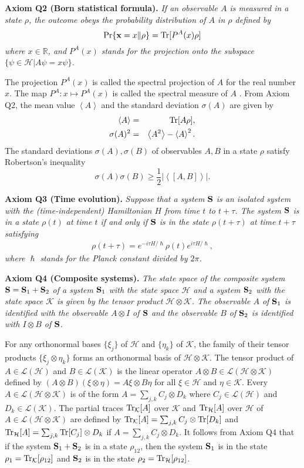 \documentclass[graybox]{svmult}
\newcommand{\beq}{\begin{equation}}
\newcommand{\eeq}{\end{equation}}
\newcommand{\beql}[1]{\begin{equation}\label{eq:#1}}
\newcommand{\beqa}{\begin{eqnarray}}
\newcommand{\eeqa}{\end{eqnarray}}
\newcommand{\bS}{{\bf S}}
\newcommand{\cH}{{\mathcal H}}
\newcommand{\cK}{{\mathcal K}}
\newcommand{\cL}{{\mathcal L}}
\newcommand{\et}{\eta}
\def\ps{\psi}
\newcommand{\rh}{\rho}
\newcommand{\si}{\sigma}
\newcommand{\ta}{\tau}
\newcommand{\Tr}{\mbox{\rm Tr}}
\newcommand{\bx}{{\bf x}}
\newcommand{\R}{\mathbb{R}}
\newcommand{\bracket}[1]{\left\langle#1\right\rangle}
\begin{document}
{\bf Axiom Q2 (Born statistical formula).}
{\em If an observable $A$ is measured in a state $\rho$, 
the outcome obeys the probability distribution
of $A$ in $\rho$ defined by
\beq
\Pr\{\bx=x\|\rh\}=\Tr[P^{A}(x)\rh]
\eeq
where $x\in\R$, and $P^{A}(x)$ stands for the projection 
onto the subspace $\{\ps\in\cH| A\ps=x\ps\}$.}
\bigskip


The projection $P^{A}(x)$ is called the spectral projection of $A$
for the real number $x$.
The map $P^{A}:x\mapsto P^{A}(x)$ is called the 
spectral measure of $A$ \cite{Hal51}.
From Axiom Q2, the mean value  $\bracket{A}$
and the standard deviation $\si(A)$ are given by
\beqa
\bracket{A}&=&\Tr[A\rh],\\
\si(A)^2&=&\bracket{A^2}-\bracket{A}^2.
\eeqa
The standard deviations $\si(A),\si(B)$
of observables $A,B$ in a state $\rh$ satisfy 
Robertson's inequality
\beql{URSP}
\si(A)\si(B)\ge\frac{1}{2}|\bracket{[A,B]}|.
\eeq
\bigskip

{\bf Axiom Q3 (Time evolution).}
{\em Suppose that a system $\bS$ is an isolated system with the (time-independent)
Hamiltonian $H$ from time $t$ to $t+\ta$.
The system $\bS$ is in a state  $\rh(t)$ at time $t$ if and only if\/ $\bS$ is in the
state $\rh(t+\ta)$ at time $t+\ta$ satisfying
\beqa
\rh(t+\ta)=e^{-i\ta H/\hslash}\rh(t)e^{i\ta H/\hslash},
\eeqa
where $\hslash$ stands for the Planck constant divided by $2\pi$.}
\bigskip

{\bf Axiom Q4 (Composite systems).}
{\em The state space of the composite system $\bS=\bS_{1}+\bS_{2}$ 
of a system $\bS_{1}$ with the
state space $\cH$ and a system  $\bS_{2}$ with the
state space $\cK$ is given by the tensor product 
$\cH\otimes\cK$.  The observable $A$ of\/ $\bS_1$
is identified with the observable  $A\otimes I$  of\/ $\bS$ and 
the observable $B$ of\/ $\bS_2$ is identified with 
 $I\otimes B$ of \/ $\bS$.}
\bigskip

For any orthonormal bases $\{\xi_j\}$ of $\cH$ and $\{\et_k\}$ of $\cK$, 
the family of their tensor products
$\{\xi_j\otimes\et_k\}$ forms an orthonormal basis of $\cH\otimes\cK$.
The tensor product of $A\in\cL(\cH)$ and  $B\in\cL(\cK)$ is the linear operator 
$A\otimes B\in\cL(\cH\otimes\cK)$ defined by 
$(A\otimes B)(\xi\otimes \et)=A\xi\otimes B\et$ for all $\xi\in\cH$ and $\et\in\cK$.
Every $A\in \cL(\cH\otimes\cK)$ is of the form $A=\sum_{j,k}C_j\otimes D_k$
where $C_j\in\cL(\cH)$ and $D_k\in\cL(\cK)$.
The partial traces $\Tr_{\cK}[A]$ over $\cK$ and $\Tr_{\cH}[A]$ over $\cH$ 
of $A\in\cL(\cH\otimes \cK)$ 
are defined by $\Tr_{\cK}[A]=\sum_{j,k}C_j\otimes \Tr[D_k]$ and
$\Tr_{\cH}[A]=\sum_{j,k}\Tr[C_j]\otimes D_k$  if
$A=\sum_{j,k}C_j\otimes D_k$.
It follows from Axiom Q4 that 
if the system $\bS_{1}+\bS_{2}$ is in a state $\rh_{12}$, then the system
$\bS_{1}$ is in the state $\rh_{1}=\Tr_{\cK}[\rh_{12}]$  and $\bS_{2}$ is in the state 
$\rh_{2}=\Tr_{\cH}[\rh_{12}]$.
\end{document}
